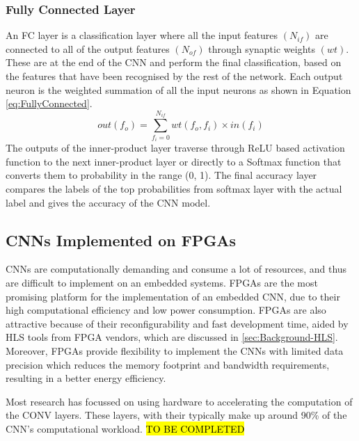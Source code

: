 \documentclass[12pt]{article}
\begin{document}
\subsubsection{Fully Connected Layer}
\label{sec:Background-CNN-FC}
\vspace{-12pt}

An FC layer is a classification layer where all the input features $(N_{if})$ are connected to all of the output features $(N_{of})$ through synaptic weights $(wt)$. These are at the end of the CNN and perform the final classification, based on the features that have been recognised by the rest of the network. Each output neuron is the weighted summation of all the input neurons as shown in Equation \ref{eq:FullyConnected}\cite{fpgaCnnAccelerator}.
\begin{equation}
out(f_o)=\sum^{N_{if}}_{f_i=0}wt(f_o,f_i)\times in(f_i)
\label{eq:FullyConnected}
\end{equation}
The outputs of the inner-product layer traverse through ReLU based activation function to the next inner-product layer or directly to a Softmax function that converts them to probability in the range (0, 1). The final accuracy layer compares the labels of the top probabilities from softmax layer with the actual label and gives the accuracy of the CNN model\cite{fpgaCnnAccelerator}.

\subsection{CNNs Implemented on FPGAs}
\label{sec:Background-CNNsImplementedOnFPGAs}
\vspace{-12pt}

CNNs are computationally demanding and consume a lot of resources, and thus are difficult to implement on an embedded systems. FPGAs are the most promising platform for the implementation of an embedded CNN, due to their high computational efficiency and low power consumption. FPGAs are also attractive because of their reconfigurability and fast development time, aided by HLS tools from FPGA vendors, which are discussed in \ref{sec:Background-HLS}. Moreover, FPGAs provide flexibility to implement the CNNs with limited data precision which reduces the memory footprint and bandwidth requirements, resulting in a better energy efficiency\cite{fpgaCnnAccelerator}.

Most research has focussed on using hardware to accelerating the computation of the CONV layers. These layers, with their  typically make up around 90\% of the CNN's computational workload. \hl{TO BE COMPLETED}
\end{document}
